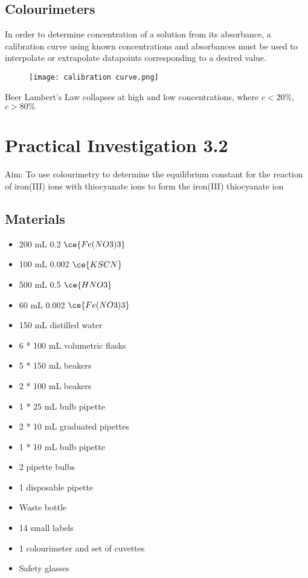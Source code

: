 	\subsection{Colourimeters}
		In order to determine concentration of a solution from its absorbance, a calibration curve using known concentrations and absorbances must be used to interpolate or extrapolate datapoints corresponding to a desired value.

		\begin{figure}[H]
			\centering
			\texttt{[image: calibration curve.png]}
		\end{figure}

		Beer Lambert's Law collapses at high and low concentrations, where $c<20\%$, $c>80\%$
	
	\section{Practical Investigation 3.2}
	Aim: To use colourimetry to determine the equilibrium constant for the reaction of iron(III) ions with thiocyanate ions to form the iron(III) thiocyanate ion

	\subsection{Materials}
		\begin{itemize}
			\item 200 mL 0.2 \unit{\moLar} $\ce{Fe(NO3)3}$
			\item 100 mL 0.002 \unit{\moLar} $\ce{KSCN}$
			\item 500 mL 0.5 \unit{\moLar} $\ce{HNO3}$
			\item 60 mL 0.002 \unit{\moLar} $\ce{Fe(NO3)3}$
			\item 150 mL distilled water
			\item 6 * 100 mL volumetric flasks
			\item 5 * 150 mL beakers
			\item 2 * 100 mL beakers
			\item 1 * 25 mL bulb pipette
			\item 2 * 10 mL graduated pipettes
			\item 1 * 10 mL bulb pipette
			\item 2 pipette bulbs
			\item 1 disposable pipette
			\item Waste bottle
			\item 14 small labels
			\item 1 colourimeter and set of cuvettes
			\item Safety glasses
		\end{itemize}


